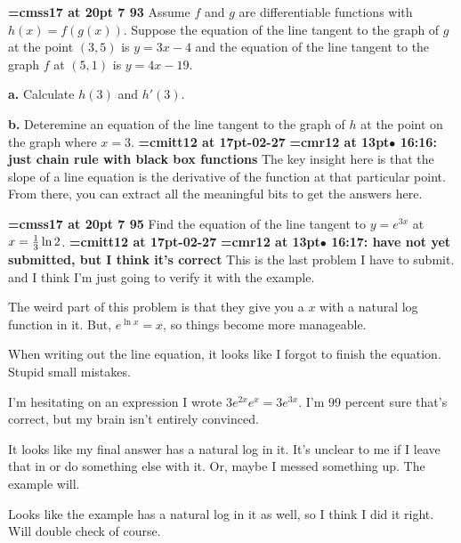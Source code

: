 {\medskip\noindent\bf\font\titlefont=cmss17 at 20pt 7 93}\medskip
Assume $f$ and $g$ are differentiable functions with
$h(x) = f(g(x))$. Suppose the equation of the line tangent
to the graph of $g$ at the point $(3, 5)$ is $y = 3x - 4$
and the equation of the line tangent to the graph $f$ at
$(5, 1)$ is $y = 4x - 19$.
\par {\bf a.} Calculate $h(3)$ and $h'(3)$.
\par {\bf b.} Deteremine an equation of the line tangent
to the graph of $h$ at the point on the graph where $x = 3$.
{\medskip\noindent\bf\font\titlefont=cmitt12 at 17pt-02-27}\medskip
{\smallskip\noindent\bf\font\titlefont=cmr12 at 13pt\titlefont $\bullet$ 16:16: just chain rule with black box functions}\smallskip
The key insight here is that the slope of a line equation is the derivative of the function at that particular point. From there, you can extract all the meaningful bits to get the answers here.
\par

{\medskip\noindent\bf\font\titlefont=cmss17 at 20pt 7 95}\medskip
Find the equation of the line tangent to $y = e^{3x}$ at
$x = {1 \over 3}\ln 2$.
{\medskip\noindent\bf\font\titlefont=cmitt12 at 17pt-02-27}\medskip
{\smallskip\noindent\bf\font\titlefont=cmr12 at 13pt\titlefont $\bullet$ 16:17: have not yet submitted, but I think it's correct}\smallskip
This is the last problem I have to submit. and I think I'm just going to verify it with the example.
\par

The weird part of this problem is that they give you a $x$ with a natural log function in it. But, $e^{\ln x} = x$, so things become more manageable.
\par

When writing out the line equation, it looks like I forgot to finish the equation. Stupid small mistakes.
\par

I'm hesitating on an expression I wrote $3e^{2x}e^x = 3e^{3x}$. I'm 99 percent sure that's correct, but my brain isn't entirely convinced.
\par

It looks like my final answer has a natural log in it. It's unclear to me if I leave that in or do something else with it. Or, maybe I messed something up. The example will.
\par

Looks like the example has a natural log in it as well, so I think I did it right. Will double check of course.
\par

